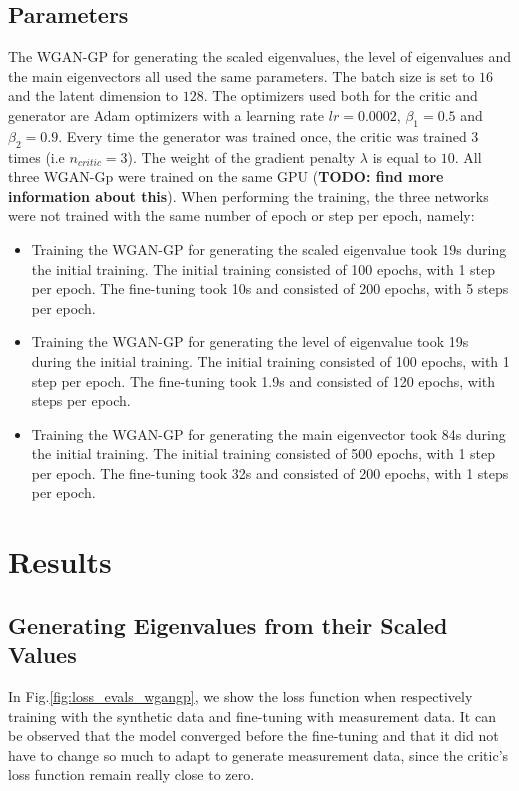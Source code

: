 \documentclass[11pt,a4paper,twoside]{report}
\begin{document}
\section{Parameters}

The WGAN-GP for generating the scaled eigenvalues, the level of eigenvalues and the main eigenvectors all used the same parameters. The batch size is set to $16$ and the latent dimension to $128$. The optimizers used both for the critic and generator are Adam optimizers with a learning rate $lr=0.0002$, $\beta_1=0.5$ and $\beta_2=0.9$. Every time the generator was trained once, the critic was trained 3 times (i.e $n_{critic} = 3$). The weight of the gradient penalty $\lambda$ is equal to $10$. All three WGAN-Gp were trained on the same GPU 
(\textbf{TODO: find more information about this}). When performing the training, the three networks were not trained with the same number of epoch or step per epoch, namely:

\begin{itemize}
    \item Training the WGAN-GP for generating the scaled eigenvalue took 19s during the initial training. The initial training consisted of 100 epochs, with 1 step per epoch. The fine-tuning took 10s and consisted of 200 epochs, with 5 steps per epoch.
    \item Training the WGAN-GP for generating the level of eigenvalue took 19s during the initial training. The initial training consisted of 100 epochs, with 1 step per epoch. The fine-tuning took 1.9s and consisted of 120 epochs, with  steps per epoch.
    \item Training the WGAN-GP for generating the main eigenvector took 84s during the initial training. The initial training consisted of 500 epochs, with 1 step per epoch. The fine-tuning took 32s and consisted of 200 epochs, with 1 steps per epoch.
\end{itemize}

\chapter{Results}

\section{Generating Eigenvalues from their Scaled Values}

In Fig.\ref{fig:loss_evals_wgangp}, we show the loss function when respectively training with the synthetic data and fine-tuning with measurement data. It can be observed that the model converged before the fine-tuning and that it did not have to change so much to adapt to generate measurement data, since the critic's loss function remain really close to zero.
\end{document}
